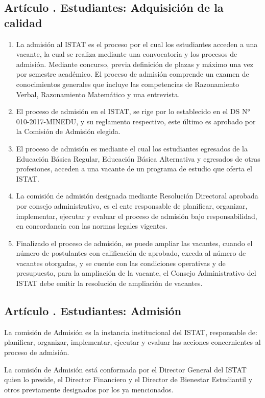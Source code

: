 \subsection{Artículo . Estudiantes: Adquisición de la calidad}
\addtocounter{ns}{1}
\begin{enumerate}
\item La admisión al ISTAT es el proceso por el cual los estudiantes acceden a una vacante, la cual se realiza mediante una convocatoria y los procesos de admisión. Mediante concurso, previa definición de plazas y máximo una vez por semestre académico. El proceso de admisión comprende un examen de conocimientos generales que incluye las competencias de Razonamiento Verbal, Razonamiento Matemático y una entrevista. 
\item El proceso de admisión en el ISTAT, se rige por lo establecido en el DS N° 010-2017-MINEDU, y su reglamento respectivo, este último es aprobado por la Comisión de Admisión elegida. 
\item El proceso de admisión es mediante el cual los estudiantes egresados de la Educación Básica Regular, Educación Básica Alternativa y egresados de otras profesiones, acceden a una vacante de un programa de estudio que oferta el ISTAT. 
\item La comisión de admisión designada mediante Resolución Directoral aprobada por consejo administrativo, es el ente responsable de planificar, organizar, implementar, ejecutar y evaluar el proceso de admisión bajo responsabilidad, en concordancia con las normas legales vigentes. 
\item Finalizado el proceso de admisión, se puede ampliar las vacantes, cuando el número de postulantes con calificación de aprobado, exceda al número de vacantes otorgadas, y se cuente con las condiciones operativas y de presupuesto, para la ampliación de la vacante, el Consejo Administrativo del ISTAT debe emitir la resolución de ampliación de vacantes.
\end{enumerate}
\subsection{Artículo . Estudiantes: Admisión}
\addtocounter{ns}{1}
La comisión de Admisión es la instancia institucional del ISTAT, responsable de: planificar, organizar, implementar, ejecutar y evaluar las acciones concernientes al proceso de admisión.
 
La comisión de Admisión está conformada por el Director General del ISTAT quien lo preside, el Director Financiero y el Director de Bienestar Estudiantil y otros previamente designados por los ya mencionados.

